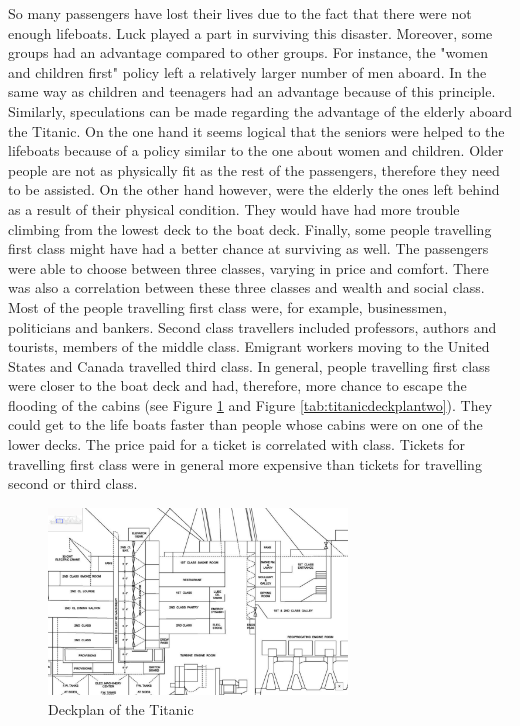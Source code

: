 \documentclass[11pt]{article}
\begin{document}
So many passengers have lost their lives due to the fact that there were not enough lifeboats. Luck played a part in surviving this disaster. Moreover, some groups had an advantage compared to other groups. For instance, the "women and children first" policy left a relatively larger number of men aboard. In the same way as children and teenagers had an advantage because of this principle. Similarly, speculations can be made regarding the advantage of the elderly aboard the Titanic. On the one hand it seems logical that the seniors were helped to the lifeboats because of a policy similar to the one about women and children. Older people are not as physically fit as the rest of the passengers, therefore they need to be assisted. On the other hand however, were the elderly the ones left behind as a result of their physical condition. They would have had more trouble climbing from the lowest deck to the boat deck. Finally, some people travelling first class might have had a better chance at surviving as well. The passengers were able to choose between three classes, varying in price and comfort. There was also a correlation between these three classes and wealth and social class. Most of the people travelling first class were, for example, businessmen, politicians and bankers. Second class travellers included professors, authors and tourists, members of the middle class. Emigrant workers moving to the United States and Canada travelled third class. In general, people travelling first class were closer to the boat deck and had, therefore, more chance to escape the flooding of the cabins (see Figure \ref{tab:titanicdeckplanone} and Figure \ref{tab:titanicdeckplantwo}). They could get to the life boats faster than people whose cabins were on one of the lower decks. The price paid for a ticket is correlated with class. Tickets for travelling first class were in general more expensive than tickets for travelling second or third class. 

\begin{figure}[htbp]
\centering
\includegraphics[width=300px]{./Deck2.png}
\caption{\label{tab:titanicdeckplanone}
Deckplan of the Titanic}
\end{figure} 
\end{document}
